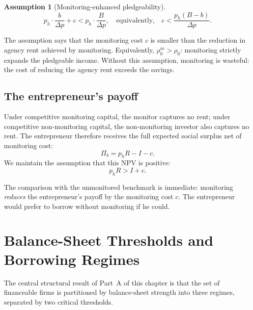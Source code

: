 \documentclass[11pt,a4paper,oneside]{book}
\theoremstyle{plain}
\theoremstyle{definition}
\newtheorem{assumption}[theorem]{Assumption}
\theoremstyle{remark}
\numberwithin{equation}{chapter}
\begin{document}
\begin{assumption}[Monitoring-enhanced pledgeability]\label{ass:mon-enhanced}
\begin{equation}\label{eq:mon-enhanced}
  p_h \cdot \frac{b}{\Delta p} + c < p_h \cdot \frac{B}{\Delta p},
  \quad \text{equivalently,} \quad
  c < \frac{p_h (B - b)}{\Delta p}.
\end{equation}
\end{assumption}

The assumption says that the monitoring cost $c$ is smaller than the reduction in agency rent achieved by monitoring.
Equivalently, $\rho_0^m > \rho_0$: monitoring strictly expands the pledgeable income.
Without this assumption, monitoring is wasteful: the cost of reducing the agency rent exceeds the savings.

\subsection{The entrepreneur's payoff}

Under competitive monitoring capital, the monitor captures no rent; under competitive non-monitoring capital, the non-monitoring investor also captures no rent.
The entrepreneur therefore receives the full expected social surplus net of monitoring cost:
\begin{equation}\label{eq:mon-Pi-monitored}
  \Pi_b = p_h R - I - c.
\end{equation}
We maintain the assumption that this NPV is positive:
\begin{equation}\label{eq:mon-NPV-positive}
  p_h R > I + c.
\end{equation}

The comparison with the unmonitored benchmark is immediate: monitoring \emph{reduces} the entrepreneur's payoff by the monitoring cost $c$.
The entrepreneur would prefer to borrow without monitoring if he could.

\section{Balance-Sheet Thresholds and Borrowing Regimes}
\label{sec:mon-thresholds}

The central structural result of Part~A of this chapter is that the set of financeable firms is partitioned by balance-sheet strength into three regimes, separated by two critical thresholds.
\end{document}

